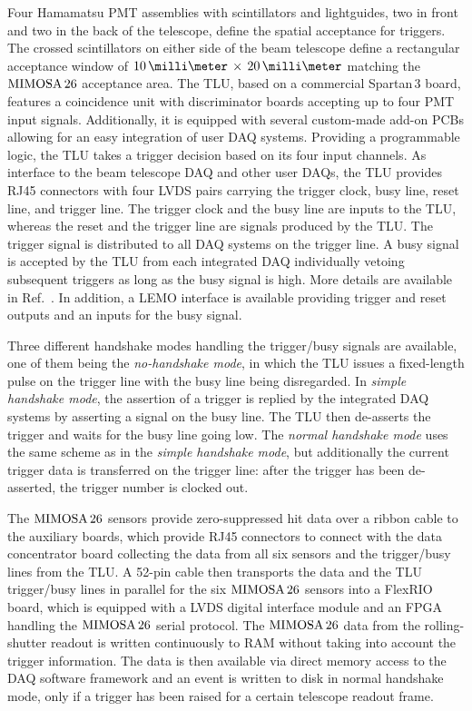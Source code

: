 Four Hamamatsu PMT assemblies with scintillators and lightguides, two in front and two in the back of the telescope, define the spatial acceptance for triggers. 
The crossed scintillators on either side of the beam telescope define a rectangular acceptance window of $10\,\milli\meter\,\times\,20\,\milli\meter$ matching the $\textrm{MIMOSA\,26}$ acceptance area. 
The TLU, based on a commercial Spartan\,3 board, features a coincidence unit with discriminator boards accepting up to four PMT input signals. 
Additionally, it is equipped with several custom-made add-on PCBs allowing for an easy integration of user DAQ systems. 
Providing a programmable logic, the TLU  takes a trigger decision based on its four input channels. 
As interface to the beam telescope DAQ and other user DAQs, the TLU provides RJ45 connectors with four LVDS pairs carrying the trigger clock, busy line, reset line, and trigger line. 
The trigger clock and the busy line are inputs to the TLU, whereas the reset and the trigger line are signals produced by the TLU. 
The trigger signal is distributed to all DAQ systems on the trigger line. 
A busy signal is accepted by the TLU from each integrated DAQ individually vetoing subsequent triggers as long as the busy signal is high. 
More details are available in Ref.~\cite{TLU,ref:TLUproc}.
In addition, a LEMO interface is available providing trigger and reset outputs and an inputs for the busy signal.

Three different handshake modes handling the trigger/busy signals are available, one of them being the \textit{no-handshake mode},
 in which the TLU issues a fixed-length pulse on the trigger line with the busy line being disregarded. 
In \textit{simple handshake mode}, the assertion of a trigger is replied by the integrated DAQ systems by asserting a signal on the busy line. 
The TLU then de-asserts the trigger and waits for the busy line going low.
The \textit{normal handshake mode} uses the same scheme as in the \textit{simple handshake mode}, but additionally the current trigger data is transferred on the trigger line:
after the trigger has been de-asserted, the trigger number is clocked out. 


The $\textrm{MIMOSA\,26}$ sensors provide zero-suppressed hit data over a ribbon cable to the auxiliary boards, which provide RJ45 connectors to connect with the
 data concentrator board collecting the data from all six sensors and the trigger/busy lines from the TLU. 
A 52-pin cable then transports the data and the TLU trigger/busy lines in parallel for the six $\textrm{MIMOSA\,26}$ sensors into a FlexRIO board, which is equipped with a LVDS digital interface module
  and an FPGA handling the $\textrm{MIMOSA\,26}$ serial protocol. 
The $\textrm{MIMOSA\,26}$ data from the rolling-shutter readout is written continuously to RAM without taking into account the trigger information. 
The data is then available via direct memory access to the DAQ software framework and an event is written to disk in normal handshake mode, only if a trigger has been raised for a certain telescope readout frame. 

